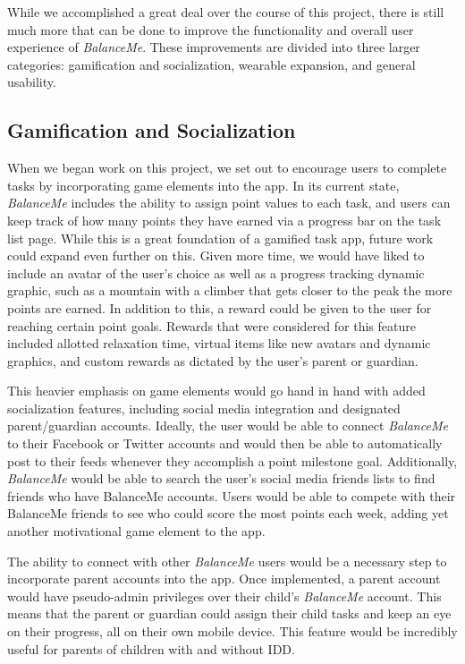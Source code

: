 \documentclass{sigchi}
\begin{document}
While we accomplished a great deal over the course of this project, there is
still much more that can be done to improve the functionality and overall user
experience of \textit{BalanceMe}. These improvements are divided into three
larger categories: gamification and socialization, wearable expansion, and
general usability.

\subsection{Gamification and Socialization}

When we began work on this project, we set out to encourage users to complete
tasks by incorporating game elements into the app. In its current state,
\textit{BalanceMe} includes the ability to assign point values to each task,
and users can keep track of how many points they have earned via a progress bar
on the task list page. While this is a great foundation of a gamified task app,
future work could expand even further on this. Given more time, we would have
liked to include an avatar of the user’s choice as well as a progress tracking
dynamic graphic, such as a mountain with a climber that gets closer to the peak
the more points are earned. In addition to this, a reward could be given to the
user for reaching certain point goals. Rewards that were considered for this
feature included allotted relaxation time, virtual items like new avatars and
dynamic graphics, and custom rewards as dictated by the user’s parent or
guardian.

This heavier emphasis on game elements would go hand in hand with added
socialization features, including social media integration and designated
parent/guardian accounts. Ideally, the user would be able to connect
\textit{BalanceMe} to their Facebook or Twitter accounts and would then be able
to automatically post to their feeds whenever they accomplish a point milestone
goal. Additionally, \textit{BalanceMe} would be able to search the user’s
social media friends lists to find friends who have BalanceMe accounts. Users
would be able to compete with their BalanceMe friends to see who could score
the most points each week, adding yet another motivational game element to the
app.

The ability to connect with other \textit{BalanceMe} users would be a necessary
step to incorporate parent accounts into the app. Once implemented, a parent
account would have pseudo-admin privileges over their child’s \textit{BalanceMe}
account. This means that the parent or guardian could assign their child tasks
and keep an eye on their progress, all on their own mobile device. This feature
would be incredibly useful for parents of children with and without IDD.
\end{document}
